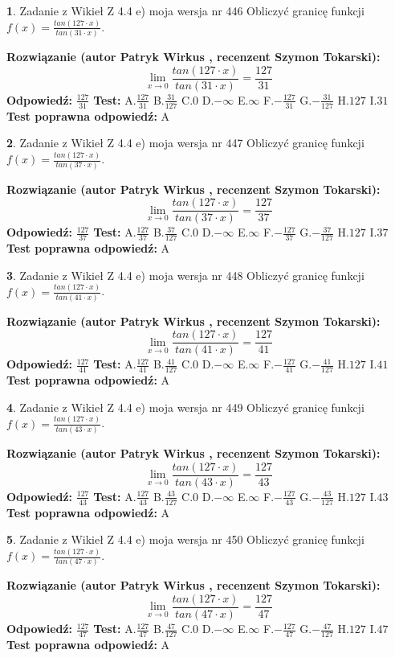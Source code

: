 \documentclass[12pt, a4paper]{article}
\theoremstyle{definition} %
\newtheorem{zad}{}
\newcommand{\zadStart}[1]{\begin{zad}#1\newline}
\newcommand{\zadStop}{\end{zad}}
\newcommand{\rozwStart}[2]{\noindent \textbf{Rozwiązanie (autor #1 , recenzent #2): }\newline}
\newcommand{\rozwStop}{\newline}
\newcommand{\odpStart}{\noindent \textbf{Odpowiedź:}\newline}
\newcommand{\odpStop}{\newline}
\newcommand{\testStart}{\noindent \textbf{Test:}\newline}
\newcommand{\testStop}{\newline}
\newcommand{\kluczStart}{\noindent \textbf{Test poprawna odpowiedź:}\newline}
\newcommand{\kluczStop}{\newline}
\begin{document}
\zadStart{Zadanie z Wikieł Z 4.4 e) moja wersja nr 446}
Obliczyć granicę funkcji $f(x)=\frac{tan(127\cdot x)}{tan(31\cdot x)}$.
\zadStop
\rozwStart{Patryk Wirkus}{Szymon Tokarski}
$$\lim\limits_{x\to 0}\frac{tan(127\cdot x)}{tan(31\cdot x)}=
\frac{127}{31}$$
\rozwStop
\odpStart
$\frac{127}{31}$
\odpStop
\testStart
A.$\frac{127}{31}$
B.$\frac{31}{127}$
C.$0$
D.$-\infty$
E.$\infty$
F.$-\frac{127}{31}$
G.$-\frac{31}{127}$
H.$127$
I.$31$
\testStop
\kluczStart
A
\kluczStop



\zadStart{Zadanie z Wikieł Z 4.4 e) moja wersja nr 447}
Obliczyć granicę funkcji $f(x)=\frac{tan(127\cdot x)}{tan(37\cdot x)}$.
\zadStop
\rozwStart{Patryk Wirkus}{Szymon Tokarski}
$$\lim\limits_{x\to 0}\frac{tan(127\cdot x)}{tan(37\cdot x)}=
\frac{127}{37}$$
\rozwStop
\odpStart
$\frac{127}{37}$
\odpStop
\testStart
A.$\frac{127}{37}$
B.$\frac{37}{127}$
C.$0$
D.$-\infty$
E.$\infty$
F.$-\frac{127}{37}$
G.$-\frac{37}{127}$
H.$127$
I.$37$
\testStop
\kluczStart
A
\kluczStop



\zadStart{Zadanie z Wikieł Z 4.4 e) moja wersja nr 448}
Obliczyć granicę funkcji $f(x)=\frac{tan(127\cdot x)}{tan(41\cdot x)}$.
\zadStop
\rozwStart{Patryk Wirkus}{Szymon Tokarski}
$$\lim\limits_{x\to 0}\frac{tan(127\cdot x)}{tan(41\cdot x)}=
\frac{127}{41}$$
\rozwStop
\odpStart
$\frac{127}{41}$
\odpStop
\testStart
A.$\frac{127}{41}$
B.$\frac{41}{127}$
C.$0$
D.$-\infty$
E.$\infty$
F.$-\frac{127}{41}$
G.$-\frac{41}{127}$
H.$127$
I.$41$
\testStop
\kluczStart
A
\kluczStop



\zadStart{Zadanie z Wikieł Z 4.4 e) moja wersja nr 449}
Obliczyć granicę funkcji $f(x)=\frac{tan(127\cdot x)}{tan(43\cdot x)}$.
\zadStop
\rozwStart{Patryk Wirkus}{Szymon Tokarski}
$$\lim\limits_{x\to 0}\frac{tan(127\cdot x)}{tan(43\cdot x)}=
\frac{127}{43}$$
\rozwStop
\odpStart
$\frac{127}{43}$
\odpStop
\testStart
A.$\frac{127}{43}$
B.$\frac{43}{127}$
C.$0$
D.$-\infty$
E.$\infty$
F.$-\frac{127}{43}$
G.$-\frac{43}{127}$
H.$127$
I.$43$
\testStop
\kluczStart
A
\kluczStop



\zadStart{Zadanie z Wikieł Z 4.4 e) moja wersja nr 450}
Obliczyć granicę funkcji $f(x)=\frac{tan(127\cdot x)}{tan(47\cdot x)}$.
\zadStop
\rozwStart{Patryk Wirkus}{Szymon Tokarski}
$$\lim\limits_{x\to 0}\frac{tan(127\cdot x)}{tan(47\cdot x)}=
\frac{127}{47}$$
\rozwStop
\odpStart
$\frac{127}{47}$
\odpStop
\testStart
A.$\frac{127}{47}$
B.$\frac{47}{127}$
C.$0$
D.$-\infty$
E.$\infty$
F.$-\frac{127}{47}$
G.$-\frac{47}{127}$
H.$127$
I.$47$
\testStop
\kluczStart
A
\kluczStop
\end{document}

